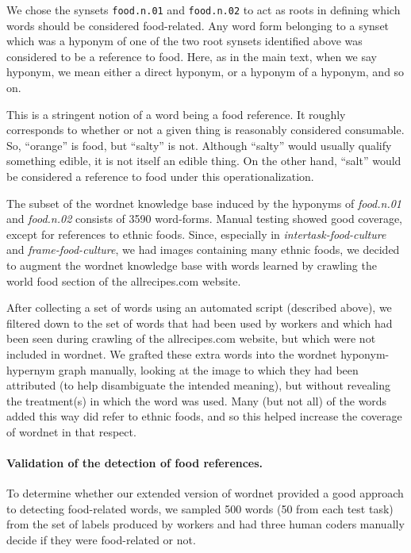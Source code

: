 \documentclass{sigchi}
\begin{document}
We chose the synsets \texttt{food.n.01} and \texttt{food.n.02} to act as roots
in defining which words should be considered food-related.  Any word form
belonging to a synset which was a hyponym of one of the two root synsets
identified above was considered to be a reference to food.  Here, as in the
main text, when we say hyponym, we mean either a direct hyponym, or a hyponym
of a hyponym, and so on.

This is a stringent notion of a word being a food reference.  It roughly
corresponds to whether or not a given thing is reasonably considered 
consumable.  So, ``orange'' is food, but ``salty'' is not.  Although ``salty''
would usually qualify something edible, it is not itself an edible thing.
On the other hand, ``salt'' would be considered a reference to food under 
this operationalization.

The subset of the wordnet knowledge base induced by the hyponyms of \textit{food.n.01}
and \textit{food.n.02} consists of 3590 word-forms.  Manual
testing showed good coverage, except for references to ethnic foods.  
Since, especially in \textit{intertask-food-culture} and 
\textit{frame-food-culture}, we had images containing many ethnic 
foods, we decided to augment the wordnet knowledge base with words learned by 
crawling the world food section of the allrecipes.com website.  

After collecting a set of words using an automated script 
(described above), we filtered down to the set of words that had been used by
workers and which had been seen during crawling of the allrecipes.com website,
but which were not included in wordnet.  We grafted these extra words into
the wordnet hyponym-hypernym graph manually, looking at the image to which 
they had been attributed (to help disambiguate the intended meaning), but 
without revealing the treatment(s) in which
the word was used.  Many (but not all) of the words added this way did refer 
to ethnic foods, and so this helped increase the coverage of wordnet in that 
respect.

\paragraph{Validation of the detection of food references.}
To determine whether our extended version of wordnet provided a good approach
to detecting food-related words, we sampled 500 words 
(50 from each test task)  from the set of labels produced by workers and had 
three human coders manually decide if they were 
food-related or not.
\end{document}
